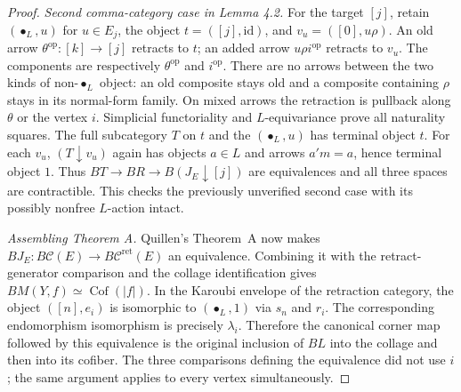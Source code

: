 \begin{proof}
\emph{Second comma-category case in Lemma 4.2.}  For the target $[j]$,
retain $(\bullet_L,u)$ for $u\in E_j$, the object
$t=([j],\mathrm{id})$, and $v_u=([0],u\rho)$.
An old arrow $\theta^{\mathrm{op}}:[k]\to[j]$ retracts to $t$;
an added arrow $u\rho i^{\mathrm{op}}$ retracts to $v_u$.
The components are respectively $\theta^{\mathrm{op}}$ and
$i^{\mathrm{op}}$.  There are no arrows between the two kinds of
non-$\bullet_L$ object: an old composite stays old and a composite
containing $\rho$ stays in its normal-form family.  On mixed arrows the
retraction is pullback along $\theta$ or the vertex $i$.  Simplicial
functoriality and $L$-equivariance prove all naturality squares.
The full subcategory $T$ on $t$ and the $(\bullet_L,u)$ has terminal
object $t$.  For each $v_u$, $(T\downarrow v_u)$ again has objects
$a\in L$ and arrows $a'm=a$, hence terminal object $1$.
Thus $BT\to BR\to B(J_E\downarrow[j])$ are equivalences and all
three spaces are contractible.  This checks the previously unverified
second case with its possibly nonfree $L$-action intact.

\emph{Assembling Theorem A.}  Quillen's Theorem~A now makes
$BJ_E:B\mathcal C(E)\to B\mathcal C^{\mathrm{ret}}(E)$ an
equivalence.  Combining it with the retract-generator comparison and
the collage identification gives $BM(Y,f)\simeq\operatorname{Cof}(|f|)$.
In the Karoubi envelope of the retraction category, the object
$([n],e_i)$ is isomorphic to $(\bullet_L,1)$ via $s_n$ and $r_i$.
The corresponding endomorphism isomorphism is precisely $\lambda_i$.
Therefore the canonical corner map followed by this equivalence is the
original inclusion of $BL$ into the collage and then into its cofiber.
The three comparisons defining the equivalence did not use $i$; the
same argument applies to every vertex simultaneously.
\end{proof}

